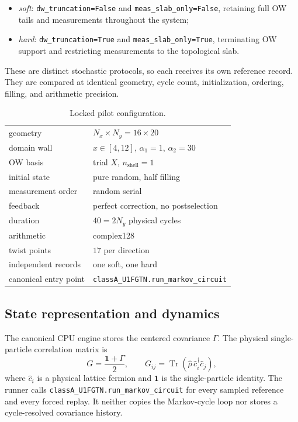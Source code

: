 \documentclass[aps,prb,twocolumn,floatfix,nofootinbib,superscriptaddress]{revtex4-2}
\newcommand{\code}[1]{\texttt{#1}}
\begin{document}
\begin{itemize}
  \item \emph{soft}: \code{dw\_truncation=False} and
  \code{meas\_slab\_only=False}, retaining full OW tails and measurements
  throughout the system;
  \item \emph{hard}: \code{dw\_truncation=True} and
  \code{meas\_slab\_only=True}, terminating OW support and restricting
  measurements to the topological slab.
\end{itemize}

These are distinct stochastic protocols, so each receives its own reference
record.  They are compared at identical geometry, cycle count, initialization,
ordering, filling, and arithmetic precision.

\begin{table}[b]
\caption{Locked pilot configuration.}
\label{tab:contract}
\begin{ruledtabular}
\begin{tabular}{ll}
geometry & $N_x\times N_y=16\times20$ \\
domain wall & $x\in[4,12]$, $\alpha_1=1$, $\alpha_2=30$ \\
OW basis & trial $X$, $n_{\mathrm{shell}}=1$ \\
initial state & pure random, half filling \\
measurement order & random serial \\
feedback & perfect correction, no postselection \\
duration & $40=2N_y$ physical cycles \\
arithmetic & complex128 \\
twist points & $17$ per direction \\
independent records & one soft, one hard \\
canonical entry point & \code{classA\_U1FGTN.run\_markov\_circuit} \\
\end{tabular}
\end{ruledtabular}
\end{table}

\subsection{State representation and dynamics}

The canonical CPU engine stores the centered covariance $\Gamma$.  The
physical single-particle correlation matrix is
\begin{equation}
  G=\frac{\mathbf{1}+\Gamma}{2},
  \qquad
  G_{ij}=\operatorname{Tr}
  (\hat\rho\,\hat c_i^\dagger\hat c_j),
  \label{eq:correlation}
\end{equation}
where $\hat c_i$ is a physical lattice fermion and $\mathbf{1}$ is the
single-particle identity.  The runner calls
\code{classA\_U1FGTN.run\_markov\_circuit} for every sampled reference and
every forced replay.  It neither copies the Markov-cycle loop nor stores a
cycle-resolved covariance history.
\end{document}
